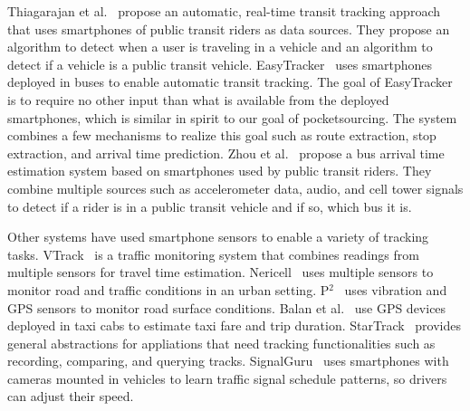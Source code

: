Thiagarajan et al.~\cite{Thiagarajan:2010:CTT} propose an automatic, real-time
transit tracking approach that uses smartphones of public transit riders as data
sources. They propose an algorithm to detect when a user is traveling in a
vehicle and an algorithm to detect if a vehicle is a public transit vehicle.
EasyTracker~\cite{Biagioni:2011:EAT} uses smartphones deployed in buses to
enable automatic transit tracking. The goal of EasyTracker is to require no
other input than what is available from the deployed smartphones, which is
similar in spirit to our goal of pocketsourcing. The system combines a few
mechanisms to realize this goal such as route extraction, stop extraction, and
arrival time prediction. Zhou et al.~\cite{Zhou:2012:LWP} propose a bus arrival
time estimation system based on smartphones used by public transit riders. They
combine multiple sources such as accelerometer data, audio, and cell tower
signals to detect if a rider is in a public transit vehicle and if so, which bus
it is.

Other systems have used smartphone sensors to enable a variety of tracking
tasks. VTrack~\cite{Thiagarajan:2009:VAE} is a traffic monitoring system that
combines readings from multiple sensors for travel time estimation.
Nericell~\cite{Mohan:2008:NRM} uses multiple sensors to monitor road and traffic
conditions in an urban setting. P$^{2}$~\cite{Eriksson:2008:PPU} uses vibration
and GPS sensors to monitor road surface conditions. Balan et
al.~\cite{Balan:2011:RTI} use GPS devices deployed in taxi cabs to estimate
taxi fare and trip duration. StarTrack~\cite{Ananthanarayanan:2009:SFE,
Haridasan:2010:SNG} provides general abstractions for appliations that need
tracking functionalities such as recording, comparing, and querying tracks.
SignalGuru~\cite{Koukoumidis:2011:SLM} uses smartphones with cameras mounted in
vehicles to learn traffic signal schedule patterns, so drivers can adjust their
speed.
